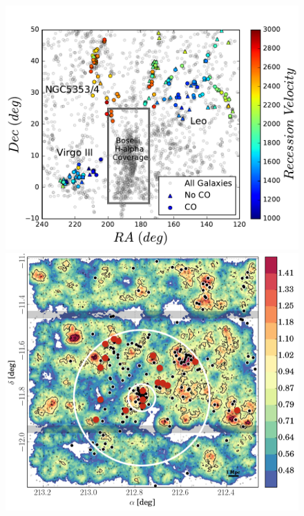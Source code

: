 \documentclass[11pt]{article}
\begin{document}
\begin{figure}[t!]
\vspace{-1cm}
\begin{minipage}{.5\textwidth}
  \centering
  \includegraphics[width=1.0\linewidth]{filaments-for-issi-prop.pdf}
\end{minipage}%
\begin{minipage}{.5\textwidth}
  \centering
  \includegraphics[width=.9\linewidth]{seediscs_filament_with_alma.png}
\end{minipage}
\vspace{-0.5cm}

\end{figure}
\end{document}
